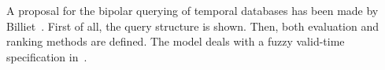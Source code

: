 A proposal for the bipolar querying of temporal databases has been made by Billiet~\cite{Billiet:Pons:Matthe:DeTre:Pons:2011:BipolarFuzzy}. First of all, the query structure is shown. Then, both evaluation and ranking methods are defined. The model deals with a fuzzy valid-time specification in~\cite{garrido2009}.

%
%

%
%
%

